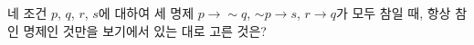 네 조건 $p$, $q$, $r$, $s$에 대하여 세 명제 $p\longrightarrow {\sim}q$, ${\sim}p\longrightarrow s$, $r\longrightarrow q$가 모두 참일 때, 항상 참인 명제인 것만을 보기에서 있는 대로 고른 것은?
